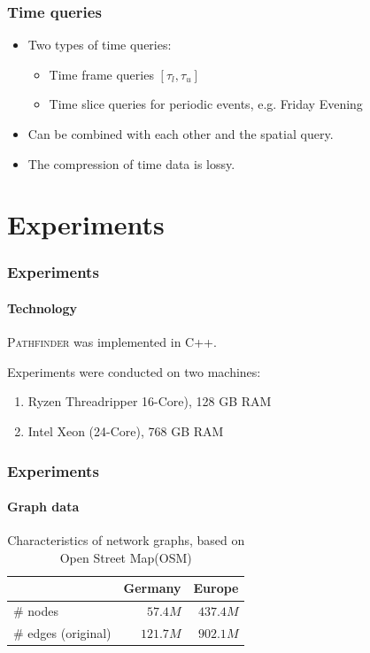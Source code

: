 \documentclass[10pt, t,
aspectratio=1610,%
]{beamer}
\newcommand{\pathfinder}{\textsc{Pathfinder}\xspace}
\begin{document}
\begin{frame}
	\frametitle{Time queries}
	\begin{itemize}

		\item	Two types of time queries: \pause
		      \begin{itemize}
			      \item Time frame queries $[\tau_l, \tau_u]$ \pause
			      \item Time slice queries for periodic events, e.g. Friday Evening \pause
		      \end{itemize}

		\item Can be combined with each other and the spatial query. \pause

		\item The compression of time data is lossy.
	\end{itemize}
\end{frame}

\section{Experiments}

\begin{frame}
	\frametitle{Experiments}
	\framesubtitle{Technology}
	\pathfinder was implemented in C++. \pause
	\medskip

	Experiments were conducted on two machines: \pause
	\begin{enumerate}
		\item Ryzen Threadripper 16-Core), 128 GB RAM
		\item Intel Xeon (24-Core), 768 GB RAM
	\end{enumerate}
\end{frame}

\begin{frame}
	\frametitle{Experiments}
	\framesubtitle{Graph data}
	\begin{table}
		{
			\caption{Characteristics of network graphs, based on Open Street Map(OSM)}
			\begin{tabular}{|l|rr|}
				\hline
				                    & Germany  & Europe
				\\ \hline
				\# nodes            & $57.4M$  & $437.4M$ \\
				\# edges (original) & $121.7M$ & $902.1M$ \\
				\hline
			\end{tabular}
		}
	\end{table}
\end{frame}
\end{document}

